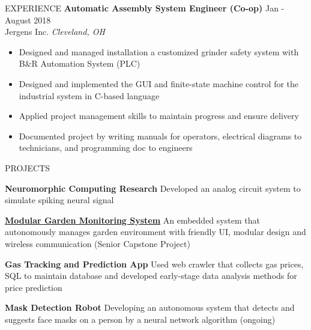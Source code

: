 \documentclass{../lib/resume} %
\begin{document}
\begin{rSection}{EXPERIENCE}
    \textbf{Automatic Assembly System Engineer (Co-op)} \hfill Jan - August 2018
    \\	Jergens Inc. \hfill \textit{Cleveland, OH}
    \begin{itemize}
        \itemsep -4pt {}
        \item Designed and managed installation a customized grinder safety system with B\&R Automation System (PLC)
        \item Designed and implemented the GUI and finite-state machine control for the industrial system in C-based language
        \item Applied project management skills to maintain progress and ensure delivery
        \item Documented project by writing manuals for operators, electrical diagrams to technicians, and programming doc to engineers
    \end{itemize}



\end{rSection}


\begin{rSection}{PROJECTS}
    \vspace{-1em}

    \item \textbf{Neuromorphic Computing Research} {Developed an analog circuit system to simulate spiking neural signal}

    \item \href{https://github.com/liu2z2/mgms}{\textbf{Modular Garden Monitoring System}} {An embedded system that autonomously manages garden environment with friendly UI, modular design and wireless communication (Senior Capstone Project)}

    \item \textbf{Gas Tracking and Prediction App} {Used web crawler that collects gas prices, SQL to maintain database and developed early-stage data analysis methods for price prediction}

    \item \textbf{Mask Detection Robot} {Developing an autonomous system that detects and suggests face masks on a person by a neural network algorithm (ongoing)}


\end{rSection}
\end{document}
